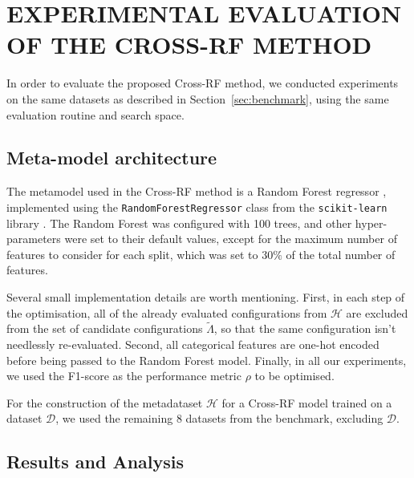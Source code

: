 \section{\uppercase{Experimental evaluation of the Cross-RF method}}

In order to evaluate the proposed Cross-RF method, we conducted experiments on the same datasets as described in Section~\ref{sec:benchmark}, using the same evaluation routine and search space.

\subsection{Meta-model architecture}

The metamodel used in the Cross-RF method is a Random Forest regressor \cite{breiman_random_2001}, implemented using the \texttt{RandomForestRegressor} class from the \texttt{scikit-learn} library \cite{pedregosa_scikit-learn_2011}. The Random Forest was configured with 100 trees, and other hyper-parameters were set to their default values, except for the maximum number of features to consider for each split, which was set to \( 30\% \) of the total number of features.

Several small implementation details are worth mentioning. First, in each step of the optimisation, all of the already evaluated configurations from \( \mathcal{H} \) are excluded from the set of candidate configurations \( \tilde{\Lambda} \), so that the same configuration isn't needlessly re-evaluated. Second, all categorical features are one-hot encoded before being passed to the Random Forest model. Finally, in all our experiments, we used the F1-score as the performance metric \( \rho \) to be optimised.

For the construction of the metadataset \( \mathcal{H} \) for a Cross-RF model trained on a dataset \( \mathcal{D} \), we used the remaining 8 datasets from the benchmark, excluding \( \mathcal{D} \).

\subsection{Results and Analysis}

